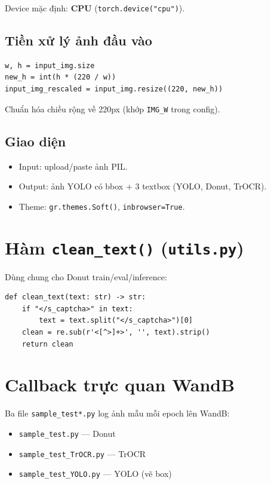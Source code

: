 \documentclass[a4paper,12pt]{report}
\begin{document}
Device mặc định: \textbf{CPU} (\texttt{torch.device("cpu")}).

\subsection{Tiền xử lý ảnh đầu vào}
\begin{lstlisting}
w, h = input_img.size
new_h = int(h * (220 / w))
input_img_rescaled = input_img.resize((220, new_h))
\end{lstlisting}
Chuẩn hóa chiều rộng về 220px (khớp \texttt{IMG\_W} trong config).

\subsection{Giao diện}
\begin{itemize}[leftmargin=*]
  \item Input: upload/paste ảnh PIL.
  \item Output: ảnh YOLO có bbox + 3 textbox (YOLO, Donut, TrOCR).
  \item Theme: \texttt{gr.themes.Soft()}, \texttt{inbrowser=True}.
\end{itemize}

\section{Hàm \texttt{clean\_text()} (\texttt{utils.py})}
Dùng chung cho Donut train/eval/inference:
\begin{lstlisting}
def clean_text(text: str) -> str:
    if "</s_captcha>" in text:
        text = text.split("</s_captcha>")[0]
    clean = re.sub(r'<[^>]+>', '', text).strip()
    return clean
\end{lstlisting}

\section{Callback trực quan WandB}
Ba file \texttt{sample\_test*.py} log ảnh mẫu mỗi epoch lên WandB:
\begin{itemize}[leftmargin=*]
  \item \texttt{sample\_test.py} --- Donut
  \item \texttt{sample\_test\_TrOCR.py} --- TrOCR
  \item \texttt{sample\_test\_YOLO.py} --- YOLO (vẽ box)
\end{itemize}

\end{document}
